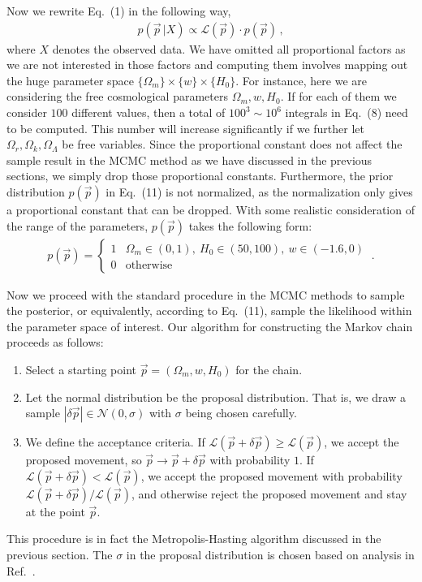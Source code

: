 \documentclass[11pt]{article}
\theoremstyle{break}
\theoremstyle{break}
\begin{document}
${}$\qquad Now we rewrite Eq.\ (1) in the following way,
\begin{align}
p(\vec{p}\,|X) \propto \mathcal{L}(\vec{p})\cdot p(\vec{p})\,,
\end{align}
where $X$ denotes the observed data. We have omitted all proportional factors as we are not interested in those factors and computing them involves mapping out the huge parameter space $\{\Omega_m\} \times \{w\} \times \{H_0\}$. For instance, here we are considering the free cosmological parameters $\Omega_m,w, H_0$. If for each of them we consider $100$ different values, then a total of $100^3 \sim 10^{6}$ integrals in Eq.\ (8) need to be computed. This number will increase significantly if we further let $\Omega_r, \Omega_k, \Omega_\Lambda$ be free variables. Since the proportional constant does not affect the sample result in the MCMC method as we have discussed in the previous sections, we simply drop those proportional constants. Furthermore, the prior distribution $p(\vec{p})$ in Eq.\ (11) is not normalized, as the normalization only gives a proportional constant that can be dropped. With some realistic consideration of the range of the parameters, $p(\vec{p})$ takes the following form:
\begin{align*}
p(\vec{p}) = \begin{cases}
1 & \Omega_m\in (0,1), \ H_0\in (50,100),\ w\in (-1.6, 0) \\
0 & \text{otherwise}
\end{cases}\ .
\end{align*}

${}$\qquad Now we proceed with the standard procedure in the MCMC methods to sample the posterior, or equivalently, according to Eq.\ (11), sample the likelihood within the parameter space of interest. Our algorithm for constructing the Markov chain proceeds as follows:
\begin{enumerate}
\item Select a starting point $\vec{p} = (\Omega_m, w, H_0)$ for the chain.
\item Let the normal distribution be the proposal distribution. That is, we draw a sample $|\delta \vec{p}| \in \mathcal{N}(0,\sigma)$ with $\sigma$ being chosen carefully.
\item We define the acceptance criteria. If $\mathcal{L}(\vec{p}+\delta \vec{p}) \geq \mathcal{L}(\vec{p})$, we accept the proposed movement, so $\vec{p} \to \vec{p} + \delta \vec{p}$ with probability $1$. If $\mathcal{L}(\vec{p} + \delta \vec{p}) < \mathcal{L}(\vec{p})$, we accept the proposed movement with probability $\mathcal{L}(\vec{p}+\delta\vec{p})/\mathcal{L}(\vec{p})$, and otherwise reject the proposed movement and stay at the point $\vec{p}$.
\end{enumerate} 
This procedure is in fact the Metropolis-Hasting algorithm discussed in the previous section. The $\sigma$ in the proposal distribution is chosen based on analysis in {Ref.\ \cite{U21}}. \\
\end{document}
